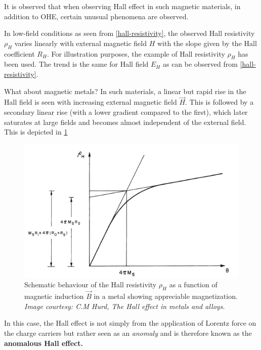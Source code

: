 It is observed that when observing Hall effect in such magnetic materials, in addition to OHE, certain unusual phenomena are observed.

In low-field conditions as seen from \cref{hall-resistivity}, the observed Hall resistivity $ \rho_H $ varies linearly with external magnetic field $ H $ with the slope given by the Hall coefficient $ R_H $.
For illustration purposes, the example of Hall resistivity $ \rho_H $ has been used.
The trend is the same for Hall field $ E_H $ as can be observed from \cref{hall-resistivity}.

What about magnetic metals?
In such materials, a linear but rapid rise in the Hall field is seen with increasing external magnetic field $ \vec{H} $.
This is followed by a secondary linear rise (with a lower gradient compared to the first), which later saturates at large fields and becomes almost independent of the external field.
This is depicted in \cref{fig:hall-rho-linear}

\begin{figure}[h!]
    \centering
    \includegraphics[scale=0.6]{hall-rho-hurd.png}
    \caption{Schematic behaviour of the Hall resistivity $ \rho_H $ as a function of magnetic induction $ \vec{B} $ in a metal showing appreciable magnetization.\\ \vspace{0.2cm} \textit{Image courtesy: C.M Hurd, The Hall effect in metals and alloys.} }
    \label{fig:hall-rho-linear}
\end{figure}

In this case, the Hall effect is not simply from the application of Lorentz force on the charge carriers but rather seen as an \textit{anomaly} and is therefore known as the \textbf{anomalous Hall effect.}


